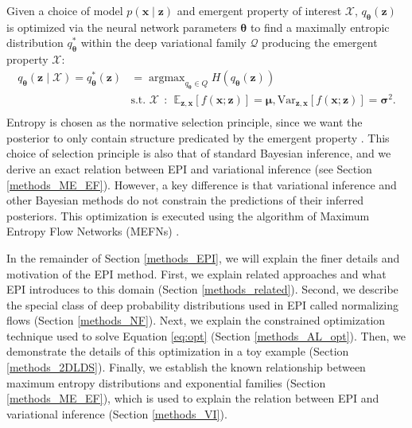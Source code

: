 \documentclass[11pt]{article}
\DeclareMathOperator*{\argmax}{argmax}
\begin{document}
Given a choice of model $p(\mathbf{x} \mid \mathbf{z})$ and emergent property of interest $\mathcal{X}$, $q_{\bm{\theta}}(\mathbf{z})$ is optimized via the neural network parameters $\bm{\theta}$ to find a maximally entropic distribution $q_{\bm{\theta}}^*$ within the deep variational family $\mathcal{Q}$ producing the emergent property $\mathcal{X}$:
\begin{equation} \label{eq:opt}
\begin{split}
q_{\bm{\theta}}(\mathbf{z} \mid \mathcal{X}) = q_{\bm{\theta}}^*(\mathbf{z}) &= \argmax_{q_{\bm{\theta}} \in Q} H(q_{\bm{\theta}}(\mathbf{z})) \\
 &  \text{s.t.  } \mathcal{X} ~~:~~ \mathbb{E}_{\mathbf{z},\mathbf{x}}\left[f(\mathbf{x}; \mathbf{z})\right] = \bm{\mu}, \text{Var}_{\mathbf{z},\mathbf{x}}\left[f(\mathbf{x}; \mathbf{z})\right] = \bm{\sigma}^2. \\
 \end{split}
\end{equation} 
Entropy is chosen as the normative selection principle, since we want the posterior to only contain structure predicated by the emergent property \cite{jaynes1957information, elsayed2017structure}.
This choice of selection principle is also that of standard Bayesian inference, and we derive an exact relation between EPI and variational inference (see Section \ref{methods_ME_EF}).
However, a key difference is that variational inference and other Bayesian methods do not constrain the predictions of their inferred posteriors.
This optimization is executed using the algorithm of Maximum Entropy Flow Networks (MEFNs) \cite{loaiza2017maximum}.

In the remainder of Section \ref{methods_EPI}, we will explain the finer details and motivation of the EPI method. 
First, we explain related approaches and what EPI introduces to this domain (Section \ref{methods_related}).
Second, we describe the special class of deep probability distributions used in EPI called normalizing flows (Section \ref{methods_NF}).  
Next, we explain the constrained optimization technique used to solve Equation \ref{eq:opt} (Section \ref{methods_AL_opt}).
Then, we demonstrate the details of this optimization in a toy example (Section \ref{methods_2DLDS}).
Finally, we establish the known relationship between maximum entropy distributions and exponential families (Section \ref{methods_ME_EF}), which is used to explain the relation between EPI and variational inference (Section \ref{methods_VI}).
\end{document}
